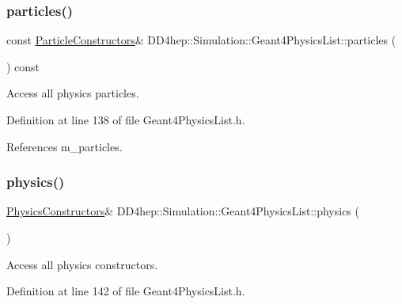 \subsubsection{\texorpdfstring{particles()}{particles()}\hspace{0.1cm}{\footnotesize\ttfamily [2/2]}}
{\footnotesize\ttfamily const \hyperlink{class_d_d4hep_1_1_simulation_1_1_geant4_physics_list_afaee3763aea79b299830be37f9642342}{Particle\+Constructors}\& D\+D4hep\+::\+Simulation\+::\+Geant4\+Physics\+List\+::particles (\begin{DoxyParamCaption}{ }\end{DoxyParamCaption}) const\hspace{0.3cm}{\ttfamily [inline]}}



Access all physics particles. 



Definition at line 138 of file Geant4\+Physics\+List.\+h.



References m\+\_\+particles.

\hypertarget{class_d_d4hep_1_1_simulation_1_1_geant4_physics_list_a02c18b4acdacd390c3c1b1c4609f1c7b}{}\label{class_d_d4hep_1_1_simulation_1_1_geant4_physics_list_a02c18b4acdacd390c3c1b1c4609f1c7b} 
\subsubsection{\texorpdfstring{physics()}{physics()}\hspace{0.1cm}{\footnotesize\ttfamily [1/2]}}
{\footnotesize\ttfamily \hyperlink{class_d_d4hep_1_1_simulation_1_1_geant4_physics_list_a5953826b626c21fa4b26ab9a07f3b8ad}{Physics\+Constructors}\& D\+D4hep\+::\+Simulation\+::\+Geant4\+Physics\+List\+::physics (\begin{DoxyParamCaption}{ }\end{DoxyParamCaption})\hspace{0.3cm}{\ttfamily [inline]}}



Access all physics constructors. 



Definition at line 142 of file Geant4\+Physics\+List.\+h.



